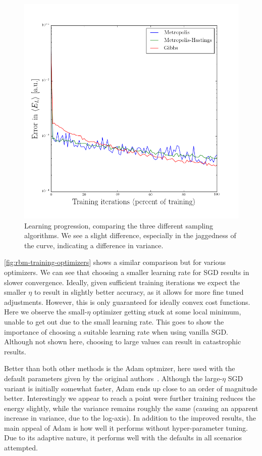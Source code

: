 \documentclass[a4paper, 11pt]{article}
\begin{document}
\begin{figure}[ht]
    \centering
    \includegraphics[width=0.8\linewidth]{../results/learning-samplers.png}
    \caption{Learning progression, comparing the three different sampling
    algorithms. We see a slight difference, especially in the jaggedness of the
    curve, indicating a difference in variance.}
    \label{fig:rbm-training-samplers}
\end{figure}


\begin{multicols}{2}

    \autoref{fig:rbm-training-optimizers} shows a similar comparison but for
    various optimizers. We can see that choosing a smaller learning rate for SGD
    results in slower convergence. Ideally, given sufficient training iterations
    we expect the smaller $\eta$ to result in slightly better accuracy, as it
    allows for more fine tuned adjustments. However, this is only guaranteed for
    ideally convex cost functions. Here we observe the small-$\eta$ optimizer
    getting stuck at some local minimum, unable to get out due to the small
    learning rate. This goes to show the importance of choosing a suitable
    learning rate when using vanilla SGD. Although not shown here, choosing to
    large values can result in catastrophic results.

    Better than both other methods is the Adam optmizer, here used with the
    default parameters given by the original authors~\cite{KingmaB14}. Although
    the large-$\eta$ SGD variant is initially somewhat faster, Adam ends up
    close to an order of magnitude better. Interestingly we appear to reach a
    point were further training reduces the energy slightly, while the variance
    remains roughly the same (causing an apparent increase in variance, due to
    the log-axis). In addition to the improved results, the main appeal of Adam
    is how well it performs without hyper-parameter tuning. Due to its adaptive
    nature, it performs well with the defaults in all scenarios attempted.
\end{multicols}
\end{document}
